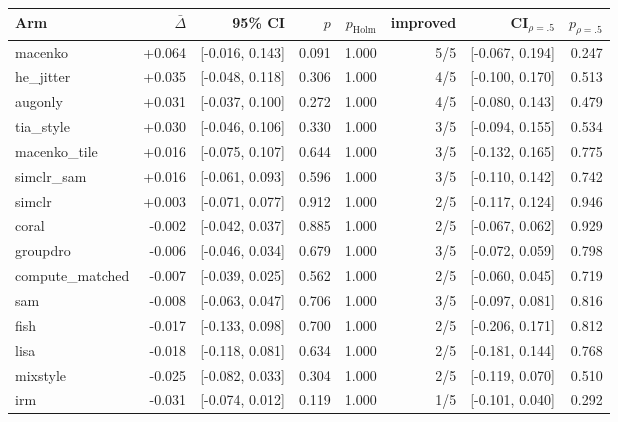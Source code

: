 \begin{tabular}{lrrrrrrr}
\toprule
Arm & $\bar\Delta$ & 95\% CI & $p$ & $p_\text{Holm}$ & improved & CI$_{\rho=.5}$ & $p_{\rho=.5}$ \\
\midrule
macenko & +0.064 & [-0.016, 0.143] & 0.091 & 1.000 & 5/5 & [-0.067, 0.194] & 0.247 \\
he\_jitter & +0.035 & [-0.048, 0.118] & 0.306 & 1.000 & 4/5 & [-0.100, 0.170] & 0.513 \\
augonly & +0.031 & [-0.037, 0.100] & 0.272 & 1.000 & 4/5 & [-0.080, 0.143] & 0.479 \\
tia\_style & +0.030 & [-0.046, 0.106] & 0.330 & 1.000 & 3/5 & [-0.094, 0.155] & 0.534 \\
macenko\_tile & +0.016 & [-0.075, 0.107] & 0.644 & 1.000 & 3/5 & [-0.132, 0.165] & 0.775 \\
simclr\_sam & +0.016 & [-0.061, 0.093] & 0.596 & 1.000 & 3/5 & [-0.110, 0.142] & 0.742 \\
simclr & +0.003 & [-0.071, 0.077] & 0.912 & 1.000 & 2/5 & [-0.117, 0.124] & 0.946 \\
coral & -0.002 & [-0.042, 0.037] & 0.885 & 1.000 & 2/5 & [-0.067, 0.062] & 0.929 \\
groupdro & -0.006 & [-0.046, 0.034] & 0.679 & 1.000 & 3/5 & [-0.072, 0.059] & 0.798 \\
compute\_matched & -0.007 & [-0.039, 0.025] & 0.562 & 1.000 & 2/5 & [-0.060, 0.045] & 0.719 \\
sam & -0.008 & [-0.063, 0.047] & 0.706 & 1.000 & 3/5 & [-0.097, 0.081] & 0.816 \\
fish & -0.017 & [-0.133, 0.098] & 0.700 & 1.000 & 2/5 & [-0.206, 0.171] & 0.812 \\
lisa & -0.018 & [-0.118, 0.081] & 0.634 & 1.000 & 2/5 & [-0.181, 0.144] & 0.768 \\
mixstyle & -0.025 & [-0.082, 0.033] & 0.304 & 1.000 & 2/5 & [-0.119, 0.070] & 0.510 \\
irm & -0.031 & [-0.074, 0.012] & 0.119 & 1.000 & 1/5 & [-0.101, 0.040] & 0.292 \\
\bottomrule
\end{tabular}
